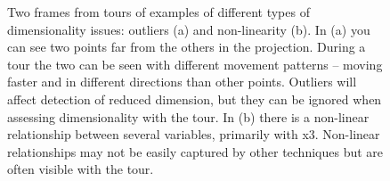 \documentclass[
  letterpaper,
]{krantz}
\begin{document}
\begin{figure}

\begin{minipage}{0.50\linewidth}



\end{minipage}%
%
\begin{minipage}{0.50\linewidth}



\end{minipage}%

\caption{\label{fig-outlier-nonlin-pdf}Two frames from tours of examples
of different types of dimensionality issues: outliers (a) and
non-linearity (b). In (a) you can see two points far from the others in
the projection. During a tour the two can be seen with different
movement patterns -- moving faster and in different directions than
other points. Outliers will affect detection of reduced dimension, but
they can be ignored when assessing dimensionality with the tour. In (b)
there is a non-linear relationship between several variables, primarily
with x3. Non-linear relationships may not be easily captured by other
techniques but are often visible with the tour.}

\end{figure}%
\end{document}
